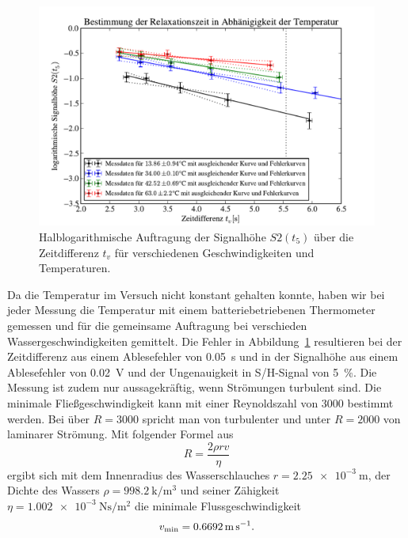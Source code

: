 \documentclass[paper=a4,
	fontsize=10pt,
	DIV=18,
	twocolumn,
	parskip=half
	]{scrartcl}
\numberwithin{equation}{section}    %
\begin{document}
\begin{figure}[htp]
	\begin{center}
		\includegraphics[width=\columnwidth]{Data-Plots/06-relaxation.pdf}
		\caption{Halblogarithmische Auftragung der Signalhöhe $S2(t_5)$ über die Zeitdifferenz $t_v$ für verschiedenen Geschwindigkeiten und Temperaturen.}
		\label{fig.relaxation}
	\end{center}
\end{figure}

Da die Temperatur im Versuch nicht konstant gehalten konnte, haben wir bei jeder Messung die Temperatur mit einem batteriebetriebenen Thermometer gemessen und für die gemeinsame Auftragung bei verschieden Wassergeschwindigkeiten gemittelt. Die Fehler in Abbildung~\ref{fig.relaxation} resultieren bei der Zeitdifferenz aus einem Ablesefehler von \SI{0.05}{\second} und in der Signalhöhe aus einem Ablesefehler von \SI{0.02}{\volt} und der Ungenauigkeit in S/H-Signal von \SI{5}{\percent}.
Die Messung ist zudem nur aussagekräftig, wenn Strömungen turbulent sind. Die minimale Fließgeschwindigkeit kann mit einer Reynoldszahl von 3000 bestimmt werden. Bei über $R = 3000$ spricht man von turbulenter und unter $R=2000$ von laminarer Strömung. Mit folgender Formel aus~\citet{anleitung}
\begin{equation}
	R=\frac{2\rho rv}{\eta}
\end{equation}
ergibt sich mit dem Innenradius des Wasserschlauches $r=\SI{2.25e-3}{\meter}$, der Dichte des Wassers $\rho=\SI{998.2}{\kilo\per\meter^3}$ und seiner Zähigkeit $\eta = \SI{1.002e-3}{\newton\second\per\meter\squared}$ die minimale Flussgeschwindigkeit
\begin{equation}
	v_{\rm min} = \SI{0.6692}{\meter\per\second}.
	\label{eq.vmin}
\end{equation}
\end{document}
